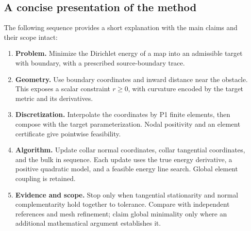 \documentclass[11pt,a4paper]{article}
\begin{document}
\subsection{A concise presentation of the method}
The following sequence provides a short explanation with the main claims
and their scope intact:
\begin{enumerate}
 \item \textbf{Problem.} Minimize the Dirichlet energy of a map into an
 admissible target with boundary, with a prescribed source-boundary trace.
 \item \textbf{Geometry.} Use boundary coordinates and inward distance
 near the obstacle. This exposes a scalar constraint \(r\geq0\), with
 curvature encoded by the target metric and its derivatives.
 \item \textbf{Discretization.} Interpolate the coordinates by P1 finite
 elements, then compose with the target parameterization. Nodal positivity
 and an element certificate give pointwise feasibility.
 \item \textbf{Algorithm.} Update collar normal coordinates, collar
 tangential coordinates, and the bulk in sequence. Each update uses the
 true energy derivative, a positive quadratic model, and a feasible
 energy line search. Global element coupling is retained.
 \item \textbf{Evidence and scope.} Stop only when tangential stationarity
 and normal complementarity hold together to tolerance. Compare with
 independent references and mesh refinement; claim global minimality only
 where an additional mathematical argument establishes it.
\end{enumerate}
\end{document}
